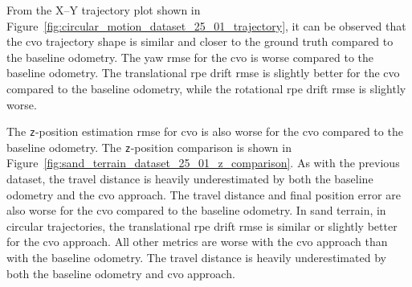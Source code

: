 \documentclass[report.tex]{subfiles}
\begin{document}

    
    
    From the X--Y trajectory plot shown in Figure~\ref{fig:circular_motion_dataset_25_01_trajectory}, it can be observed that the \gls{cvo} trajectory shape is similar and closer to the ground truth compared to the baseline odometry. The yaw \gls{rmse} for the \gls{cvo} is worse compared to the baseline odometry. The translational \gls{rpe} drift \gls{rmse} is slightly better for the \gls{cvo} compared to the baseline odometry, while the rotational \gls{rpe} drift \gls{rmse} is slightly worse. 
    
    The \texttt{z}-position estimation \gls{rmse} for \gls{cvo} is also worse for the \gls{cvo} compared to the baseline odometry. The \texttt{z}-position comparison is shown in Figure~\ref{fig:sand_terrain_dataset_25_01_z_comparison}. As with the previous dataset, the travel distance is heavily underestimated by both the baseline odometry and the \gls{cvo} approach. The travel distance and final position error are also worse for the \gls{cvo} compared to the baseline odometry. In sand terrain, in circular trajectories, the translational \gls{rpe} drift \gls{rmse} is similar or slightly better for the \gls{cvo} approach. All other metrics are worse with the \gls{cvo} approach than with the baseline odometry. The travel distance is heavily underestimated by both the baseline odometry and \gls{cvo} approach. 
    \FloatBarrier
    
\end{document}
